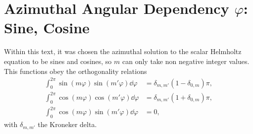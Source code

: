 \section*{Azimuthal Angular Dependency $\varphi$: Sine, Cosine}

Within this text, it was chosen the azimuthal solution to the scalar Helmholtz equation to be sines and cosines, so $m$ can only take non negative integer values. This functions obey the orthogonality relations
%
\begin{align}
\int_0^{2\pi} \sin(m\varphi)\sin(m'\varphi) \dd{\varphi} &= \delta_{m,m'}( 1 - \delta_{0,m}) \pi,
\label{eq:SinOrth}\\
\int_0^{2\pi} \cos(m\varphi)\cos(m'\varphi) \dd{\varphi} & =\delta_{m,m'}( 1+ \delta_{0,m}) \pi,
\label{eq:CosOrth}\\
\int_0^{2\pi} \cos(m\varphi)\sin(m'\varphi) \dd{\varphi} &=0,
\label{eq:SinCosOrth}
\end{align}
%
with $\delta_{m,m'}$ the Kroneker delta.

